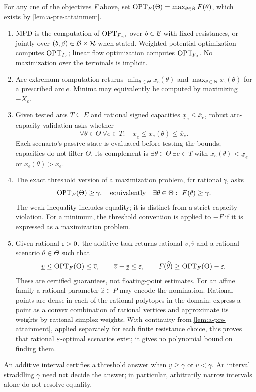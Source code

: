 \begin{definition}
\label{def:a-pre-problems}
For any one of the objectives $F$ above, set
$\mathrm{OPT}_F(\Theta)=\max_{\theta\in\Theta}F(\theta)$, which exists by
\cref{lem:a-pre-attainment}.
\begin{enumerate}
\item $\mathrm{MPD}$ is the computation of $\mathrm{OPT}_{F_{s,t}}$ over $b\in\mathcal{B}$
with fixed resistances, or jointly over
$(b,\beta)\in\mathcal{B}\times\mathcal{R}$ when stated. Weighted potential
optimization computes $\mathrm{OPT}_{F_c}$; linear flow optimization computes
$\mathrm{OPT}_{F_d}$. No maximization over the terminals is implicit.
\item Arc extremum computation returns
$\min_{\theta\in\Theta}x_e(\theta)$ and
$\max_{\theta\in\Theta}x_e(\theta)$ for a prescribed arc $e$.
Minima may equivalently be computed by maximizing $-X_e$.
\item Given tested arcs $T\subseteq E$ and rational signed capacities
$\underline x_e\le\overline x_e$, robust arc-capacity validation asks
whether
\[
 \forall\theta\in\Theta\ \forall e\in T:\quad
 \underline x_e\le x_e(\theta)\le\overline x_e.
\]
Each scenario's passive state is evaluated before testing the bounds;
capacities do not filter $\Theta$. Its complement is
$\exists\theta\in\Theta\ \exists e\in T$ with
$x_e(\theta)<\underline x_e$ or $x_e(\theta)>\overline x_e$.
\item The exact threshold version of a maximization problem, for rational
$\gamma$, asks
\[
 \mathrm{OPT}_F(\Theta)\ge\gamma,
 \quad\text{equivalently}\quad
 \exists\theta\in\Theta:\ F(\theta)\ge\gamma.
\]
The weak inequality includes equality; it is distinct from a strict
capacity violation. For a minimum, the threshold convention is applied
to $-F$ if it is expressed as a maximization problem.
\item Given rational $\varepsilon>0$, the additive task returns rational
$\underline{v},\overline{v}$ and a rational scenario $\widehat\theta\in\Theta$ such that
\[
 \underline{v}\le\mathrm{OPT}_F(\Theta)\le\overline{v},\qquad
 \overline{v}-\underline{v}\le\varepsilon,\qquad
 F(\widehat\theta)\ge\mathrm{OPT}_F(\Theta)-\varepsilon.
\]
These are certified guarantees, not floating-point estimates. For an
affine family a rational parameter $\widehat z\in P$ may encode the
nomination. Rational points are dense in each of the rational polytopes
in the domain: express a point as a convex combination of rational
vertices and approximate its weights by rational simplex weights.
With continuity from \cref{lem:a-pre-attainment}, applied separately
for each finite resistance choice, this proves that rational
$\varepsilon$-optimal scenarios exist; it gives no polynomial bound on finding
them.
\end{enumerate}
\end{definition}
An additive interval certifies a threshold answer when
$\underline{v}\ge\gamma$ or $\overline{v}<\gamma$.
An interval straddling $\gamma$ need not decide the answer; in
particular, arbitrarily narrow intervals alone do not resolve equality.

